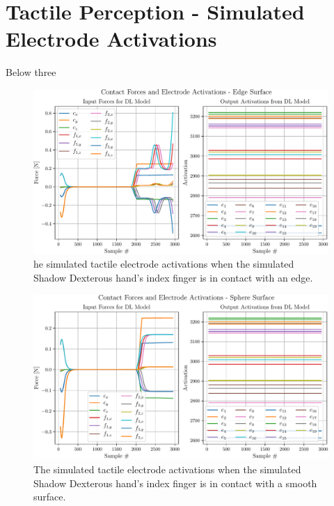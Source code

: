\chapter{Tactile Perception - Simulated Electrode Activations} \label{app:tactile-perception-simulated-electrode-activations}

Below three 

\begin{figure}[!h]
	\begin{center}
		\includegraphics[width=\textwidth]{chapters/1-tactile-perception/fig/matplotlib/edge-contact-graph.pdf}
	\end{center}
	\caption{he simulated tactile electrode activations when the simulated Shadow Dexterous hand's index finger is in contact with an edge.}
	\label{app:edge-contact-graph}
\end{figure}

\begin{figure}[!h]
	\begin{center}
		\includegraphics[width=\textwidth]{chapters/1-tactile-perception/fig/matplotlib/sphere-contact-graph.pdf}
	\end{center}
	\caption{The simulated tactile electrode activations when the simulated Shadow Dexterous hand's index finger is in contact with a smooth surface.}
	\label{app:smooth-contact-graph}
\end{figure}

